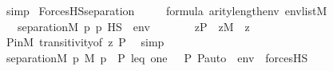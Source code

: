\begin{isabellebody}
\ simp\isanewline
{}\isamarkupfalse%
%
\endisatagproof
{\isafoldproof}%
%
\isadelimproof
\isanewline
%
\endisadelimproof
\isanewline
\isanewline
\isanewline
{}\isamarkupfalse%
\ ForcesHS{\isacharunderscore}{\kern0pt}separation\ {\isacharcolon}{\kern0pt}\ \isanewline
\ \ \ {\isachardoublequoteopen}{\isasymphi}{\isasymin}formula{\isachardoublequoteclose}\ {\isachardoublequoteopen}arity{\isacharparenleft}{\kern0pt}{\isasymphi}{\isacharparenright}{\kern0pt}{\isasymle}length{\isacharparenleft}{\kern0pt}env{\isacharparenright}{\kern0pt}{\isachardoublequoteclose}\ {\isachardoublequoteopen}env{\isasymin}list{\isacharparenleft}{\kern0pt}M{\isacharparenright}{\kern0pt}{\isachardoublequoteclose}\isanewline
\ \ \ {\isachardoublequoteopen}separation{\isacharparenleft}{\kern0pt}{\isacharhash}{\kern0pt}{\isacharhash}{\kern0pt}M{\isacharcomma}{\kern0pt}\ {\isasymlambda}p{\isachardot}{\kern0pt}\ p\ {\isasymtturnstile}HS\ {\isasymphi}\ env{\isacharparenright}{\kern0pt}{\isachardoublequoteclose}\ \isanewline
%
\isadelimproof
%
\endisadelimproof
%
\isatagproof
{}\isamarkupfalse%
\ {\isacharminus}{\kern0pt}\ \isanewline
\ \ \isamarkupfalse%
\ {\isachardoublequoteopen}z{\isasymin}P\ {\isasymLongrightarrow}\ z{\isasymin}M{\isachardoublequoteclose}\ \ z\isanewline
\ \ \ \ \isamarkupfalse%
\ P{\isacharunderscore}{\kern0pt}in{\isacharunderscore}{\kern0pt}M\ transitivity{\isacharbrackleft}{\kern0pt}of\ z\ P{\isacharbrackright}{\kern0pt}\ \isamarkupfalse%
\ simp\isanewline
\ \ \isamarkupfalse%
\isanewline
\ \ \isamarkupfalse%
\ {\isachardoublequoteopen}separation{\isacharparenleft}{\kern0pt}{\isacharhash}{\kern0pt}{\isacharhash}{\kern0pt}M{\isacharcomma}{\kern0pt}\ {\isasymlambda}p{\isachardot}{\kern0pt}\ {\isacharparenleft}{\kern0pt}M{\isacharcomma}{\kern0pt}\ {\isacharbrackleft}{\kern0pt}p{\isacharbrackright}{\kern0pt}\ {\isacharat}{\kern0pt}\ {\isacharbrackleft}{\kern0pt}P{\isacharcomma}{\kern0pt}\ leq{\isacharcomma}{\kern0pt}\ one{\isacharcomma}{\kern0pt}\ {\isasymlangle}{\isasymF}{\isacharcomma}{\kern0pt}\ {\isasymG}{\isacharcomma}{\kern0pt}\ P{\isacharcomma}{\kern0pt}\ P{\isacharunderscore}{\kern0pt}auto{\isasymrangle}{\isacharbrackright}{\kern0pt}\ {\isacharat}{\kern0pt}\ env\ {\isasymTurnstile}\ forcesHS{\isacharparenleft}{\kern0pt}{\isasymphi}{\isacharparenright}{\kern0pt}{\isacharparenright}{\kern0pt}{\isacharparenright}{\kern0pt}{\isachardoublequoteclose}\isanewline
\ \ \ \ \isamarkupfalse%

\end{isabellebody}
